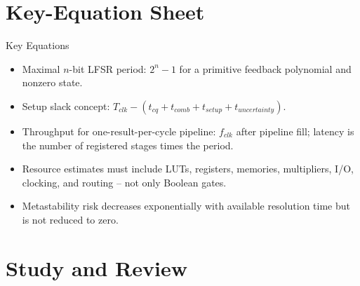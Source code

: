 \documentclass[10pt,letterpaper]{article}
\begin{document}
\section{Key-Equation Sheet}
\begin{CornellExamBox}{Key Equations}
\begin{itemize}
  \item Maximal $n$-bit LFSR period: $2^n-1$ for a primitive feedback polynomial and nonzero state.
  \item Setup slack concept: $T_{clk}-(t_{cq}+t_{comb}+t_{setup}+t_{uncertainty})$.
  \item Throughput for one-result-per-cycle pipeline: $f_{clk}$ after pipeline fill; latency is the number of registered stages times the period.
  \item Resource estimates must include LUTs, registers, memories, multipliers, I/O, clocking, and routing -- not only Boolean gates.
  \item Metastability risk decreases exponentially with available resolution time but is not reduced to zero.
\end{itemize}\end{CornellExamBox}
\section{Study and Review}
\end{document}
